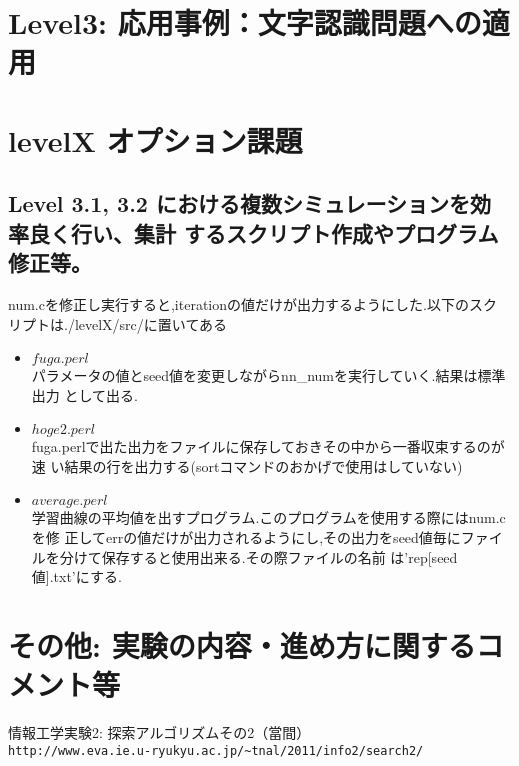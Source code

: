 \documentclass[10pt]{jarticle}
\begin{document}
\newpage

\section{Level3: 応用事例：文字認識問題への適用}





\newpage
\section{levelX オプション課題}
\subsection{Level 3.1, 3.2 における複数シミュレーションを効率良く行い、集計
 するスクリプト作成やプログラム修正等。}
num.cを修正し実行すると,iterationの値だけが出力するようにした.以下のスク
リプトは./levelX/src/に置いてある
\begin{itemize}
 \item $fuga.perl$ \\
パラメータの値とseed値を変更しながらnn\_numを実行していく.結果は標準出力
       として出る.
 \item $hoge2.perl$ \\
fuga.perlで出た出力をファイルに保存しておきその中から一番収束するのが速
       い結果の行を出力する(sortコマンドのおかげで使用はしていない)
 \item $average.perl$ \\
学習曲線の平均値を出すプログラム.このプログラムを使用する際にはnum.cを修
       正してerrの値だけが出力されるようにし,その出力をseed値毎にファイ
       ルを分けて保存すると使用出来る.その際ファイルの名前
       は'rep[seed値].txt'にする.
\end{itemize}
\section{その他: 実験の内容・進め方に関するコメント等}


\vspace{+1.0cm}
\begin{thebibliography}{99}
情報工学実験2: 探索アルゴリズムその2（當間）\\
\verb|http://www.eva.ie.u-ryukyu.ac.jp/~tnal/2011/info2/search2/|
\end{thebibliography}
\end{document}
